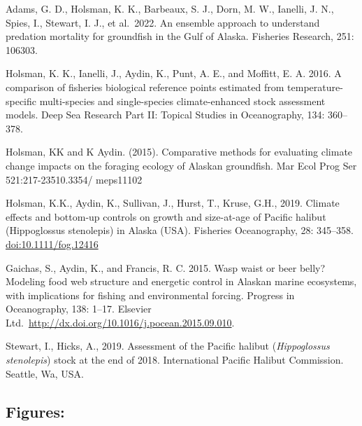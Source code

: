 \documentclass[
]{article}
\begin{document}
Adams, G. D., Holsman, K. K., Barbeaux, S. J., Dorn, M. W., Ianelli, J.
N., Spies, I., Stewart, I. J., et al.~2022. An ensemble approach to
understand predation mortality for groundfish in the Gulf of Alaska.
Fisheries Research, 251: 106303.

Holsman, K. K., Ianelli, J., Aydin, K., Punt, A. E., and Moffitt, E. A.
2016. A comparison of fisheries biological reference points estimated
from temperature-specific multi-species and single-species
climate-enhanced stock assessment models. Deep Sea Research Part II:
Topical Studies in Oceanography, 134: 360--378.

Holsman, KK and K Aydin. (2015). Comparative methods for evaluating
climate change impacts on the foraging ecology of Alaskan groundfish.
Mar Ecol Prog Ser 521:217-23510.3354/ meps11102

Holsman, K.K., Aydin, K., Sullivan, J., Hurst, T., Kruse, G.H., 2019.
Climate effects and bottom-up controls on growth and size-at-age of
Pacific halibut (Hippoglossus stenolepis) in Alaska (USA). Fisheries
Oceanography, 28: 345--358. \url{doi:10.1111/fog.12416}

Gaichas, S., Aydin, K., and Francis, R. C. 2015. Wasp waist or beer
belly? Modeling food web structure and energetic control in Alaskan
marine ecosystems, with implications for fishing and environmental
forcing. Progress in Oceanography, 138: 1--17. Elsevier
Ltd.~\url{http://dx.doi.org/10.1016/j.pocean.2015.09.010}.

Stewart, I., Hicks, A., 2019. Assessment of the Pacific halibut
(\emph{Hippoglossus stenolepis}) stock at the end of 2018. International
Pacific Halibut Commission. Seattle, Wa, USA.

\newpage

\subsection{Figures:}\label{figures}
\end{document}
